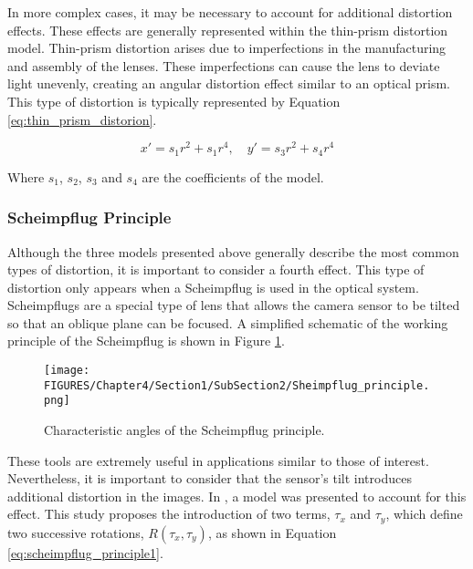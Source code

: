 In more complex cases, it may be necessary to account for additional distortion effects. These effects are generally represented within the thin-prism distortion model. Thin-prism distortion arises due to imperfections in the manufacturing and assembly of the lenses.
These imperfections can cause the lens to deviate light unevenly, creating an angular distortion effect similar to an optical prism. This type of distortion is typically represented by Equation \ref{eq:thin_prism_distorion}.
  
  \begin{equation}
    x' = s_1 r^2 +s_1 r^4,
    \quad
    y' = s_3 r^2 +s_4 r^4
    \label{eq:thin_prism_distorion}
  \end{equation}
  
Where $s_1$, $s_2$, $s_3$ and $s_4$ are the coefficients of the model. 
  
\subsubsection{Scheimpflug Principle}
  
Although the three models presented above generally describe the most common types of distortion, it is important to consider a fourth effect. This type of distortion only appears when a Scheimpflug is used in the optical system.
Scheimpflugs are a special type of lens that allows the camera sensor to be tilted so that an oblique plane can be focused. A simplified schematic of the working principle of the Scheimpflug is shown in Figure \ref{fig:scheimpflug_principle}.
  
  \begin{figure}[htbp]
    \centering
    \texttt{[image: FIGURES/Chapter4/Section1/SubSection2/Sheimpflug\_principle.png]}
    \caption{
     Characteristic angles of the Scheimpflug principle.} 
    \label{fig:scheimpflug_principle}  
  \end{figure}

These tools are extremely useful in applications similar to those of interest. Nevertheless, it is important to consider that the sensor's tilt introduces additional distortion in the images.
In \cite{Louhichi2007}, a model was presented to account for this effect. This study proposes the introduction of two terms, $\tau_x$ and $\tau_y$, which define two successive rotations, $R(\tau_x, \tau_y)$, as shown in Equation \ref{eq:scheimpflug_principle1}.

